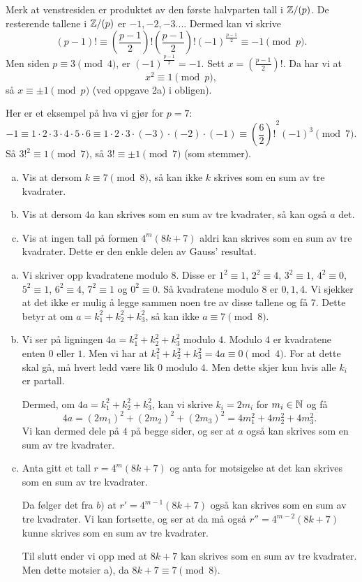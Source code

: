 \documentclass[11pt, norsk]{article}
\begin{document}
Merk at venstresiden er produktet av den første halvparten tall i $\mathbb{Z}/(p)$.  De resterende tallene i $\mathbb{Z}/(p)$ er $-1,-2,-3...$. Dermed kan vi skrive
$$
(p-1)! \equiv \left( \frac{p-1}{2} \right)! \left( \frac{p-1}{2} \right)! (-1)^{\frac{p-1}{2}} \equiv -1 \pmod p.
$$
Men siden $p \equiv 3 \pmod 4$, er $(-1)^{\frac{p-1}{2}}=-1$. Sett $x= \left(\frac{p-1}{2} \right)!$. Da har vi at
$$
x^2 \equiv 1 \pmod p,
$$
så $x \equiv \pm 1 \pmod p$ (ved oppgave 2a) i obligen).

Her er et eksempel på hva vi gjør for $p = 7$:
$$
-1 \equiv 1 \cdot 2 \cdot 3 \cdot 4 \cdot 5 \cdot 6 \equiv 1 \cdot 2 \cdot 3 \cdot (-3) \cdot (-2) \cdot (-1) \equiv {\left( \frac 62 \right)!}^2 (-1)^3 \pmod 7.
$$
Så ${3!}^2 \equiv 1 \pmod 7$, så $3! \equiv \pm 1 \pmod 7$ (som stemmer).


\begin{oppg}[Oppgave 6.3]
  \begin{enumerate}[a)]
  \item Vis at dersom $k \equiv 7 \pmod 8$, så kan ikke $k$ skrives som en sum av tre kvadrater.
\item Vis at dersom $4a$ kan skrives som en sum av tre kvadrater, så kan også $a$ det.
\item Vis at ingen tall på formen $4^m(8k+7)$ aldri kan skrives som en sum av tre kvadrater. Dette er den enkle delen av Gauss' resultat.
  \end{enumerate}
\end{oppg}

\begin{enumerate}[a)]
\item Vi skriver opp kvadratene modulo 8. Disse er $1^2 \equiv 1$, $2^2 \equiv 4$, $3^2 \equiv 1$, $4^2 \equiv 0$, $5^2 \equiv 1$, $6^2 \equiv 4$, $7^2 \equiv 1$ og $0^2 \equiv 0$. Så kvadratene modulo 8 er $0,1,4$. Vi sjekker at det ikke er mulig å legge sammen noen tre av disse tallene og få 7. Dette betyr at om $a=k_1^2+k_2^2+k_3^2$, så kan ikke $a \equiv 7 \pmod 8$.

\item 

Vi ser på ligningen $4a=k_1^2+k_2^2+k_3^2$ modulo $4$. Modulo $4$ er kvadratene enten $0$ eller $1$. Men vi har at $k_1^2+k_2^2+k_3^2=4a \equiv 0 \pmod 4$. For at dette skal gå, må hvert ledd være lik $0$ modulo $4$. Men dette skjer kun hvis alle $k_i$ er partall.

Dermed, om $4a=k_1^2+k_2^2+k_3^2$, kan vi skrive $k_i=2m_i$ for $m_i \in \mathbb{N}$ og få
$$
4a=(2m_1)^2+(2m_2)^2+(2m_3)^2 =4m_1^2+4m_2^2+4m_3^2.
$$
Vi kan dermed dele på $4$ på begge sider, og ser at $a$ også kan skrives som en sum av tre kvadrater.
\item Anta gitt et tall $r=4^m(8k+7)$ og anta for motsigelse at det kan skrives som en sum av tre kvadrater.

Da følger det fra $b)$ at $r' = 4^{m-1}(8k+7)$ også kan skrives som en sum av tre kvadrater. Vi kan fortsette, og ser at da må også $r''=4^{m-2}(8k+7)$ kunne skrives som en sum av tre kvadrater.

Til slutt ender vi opp med at $8k+7$ kan skrives som en sum av tre kvadrater. Men dette motsier a), da $8k+7 \equiv 7 \pmod 8$.
\end{enumerate}
\end{document}
